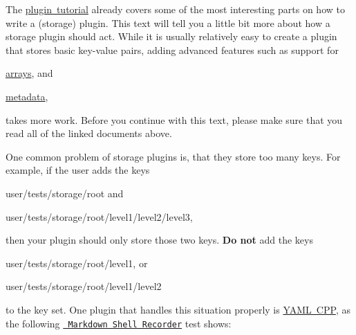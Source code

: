 The \mbox{\hyperlink{doc_tutorials_plugins_md}{plugin tutorial}} already covers some of the most interesting parts on how to write a (storage) plugin. This text will tell you a little bit more about how a storage plugin should act. While it is usually relatively easy to create a plugin that stores basic key-\/value pairs, adding advanced features such as support for


\begin{DoxyItemize}
\item \mbox{\hyperlink{doc_tutorials_arrays_md}{arrays}}, and
\item \mbox{\hyperlink{doc_dev_metadata_md}{metadata}},
\end{DoxyItemize}

takes more work. Before you continue with this text, please make sure that you read all of the linked documents above.

One common problem of storage plugins is, that they store too many keys. For example, if the user adds the keys


\begin{DoxyItemize}
\item {\ttfamily user/tests/storage/root} and
\item {\ttfamily user/tests/storage/root/level1/level2/level3},
\end{DoxyItemize}

then your plugin should only store those two keys. {\bfseries{Do not}} add the keys


\begin{DoxyItemize}
\item {\ttfamily user/tests/storage/root/level1}, or
\item {\ttfamily user/tests/storage/root/level1/level2}
\end{DoxyItemize}

to the key set. One plugin that handles this situation properly is \mbox{\hyperlink{autotoc_md780_src_plugins_yamlcpp_README_md}{Y\+A\+ML C\+PP}}, as the following \href{https://master.libelektra.org/tests/shell/shell_recorder/tutorial_wrapper}{\texttt{ Markdown Shell Recorder}} test shows\+:


\begin{DoxyCode}{0}
\DoxyCodeLine{}
\DoxyCodeLine{}
\DoxyCodeLine{}
\end{DoxyCode}



